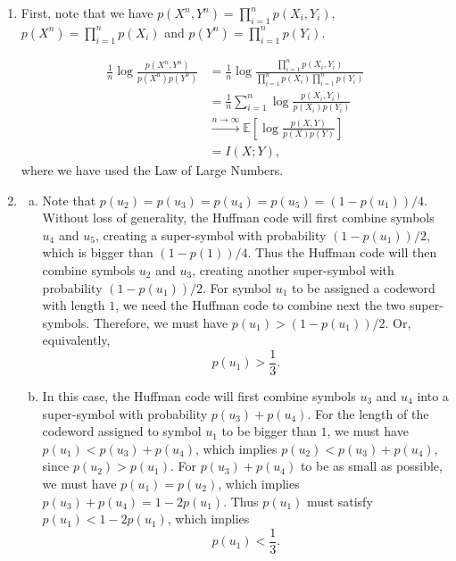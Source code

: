 \documentclass[12pt]{article}
\begin{document}
\begin{enumerate}
\begin{solution}
\begin{enumerate}[1)]
\item 


First, note that we have $p(X^n, Y^n) = \prod_{i=1}^np(X_i, Y_i)$, $p(X^n) = \prod_{i=1}^np(X_i)$ and $p(Y^n) = \prod_{i=1}^np(Y_i)$.

\begin{align*}
\frac{1}{n} \log \frac{p(X^n, Y^n)}{p(X^n)p(Y^n)} &= \frac{1}{n} \log \frac{\prod_{i=1}^np(X_i, Y_i)}{\prod_{i=1}^np(X_i)\prod_{i=1}^np(Y_i)} \\
&= \frac{1}{n} \sum_{i=1}^n \log \frac{p(X_i, Y_i)}{p(X_i)p(Y_i)} \\
& \xrightarrow{n \rightarrow \infty} \mathbb{E}[\log \frac{p(X, Y)}{p(X)p(Y)}]\\
&=I(X;Y),
\end{align*}
where we have used the Law of Large Numbers.



\item 

\begin{enumerate}[(a)]
\item Note that $p(u_2) = p(u_3) = p(u_4) = p(u_5) = (1 - p(u_1))/4$. Without loss of generality, the Huffman code will first combine symbols $u_4$ and $u_5$, creating a super-symbol with probability $(1 - p(u_1))/2$, which is bigger than $(1 - p(1))/4$. Thus the Huffman code will then combine symbols $u_2$ and $u_3$, creating another super-symbol with probability $(1- p(u_1))/2$. For symbol $u_1$ to be assigned a codeword with length $1$, we need the Huffman code to combine next the two super-symbols. Therefore, we must have $p(u_1) > (1 - p(u_1))/2$. Or, equivalently,
\begin{equation}
p(u_1) > \frac{1}{3}.
\end{equation}



\item In this case, the Huffman code will first combine symbols $u_3$ and $u_4$ into a super-symbol with probability $p(u_3) + p(u_4)$. For the length of the codeword assigned to symbol $u_1$ to be bigger than $1$, we must have $p(u_1) < p(u_3) + p(u_4)$, which implies $p(u_2) < p(u_3) + p(u_4)$, since $p(u_2) > p(u_1)$. For $p(u_3) + p(u_4)$ to be as small as possible, we must have $p(u_1) = p(u_2)$, which implies $p(u_3) + p(u_4) = 1 - 2p(u_1)$. Thus $p(u_1)$ must satisfy $p(u_1) < 1 - 2p(u_1)$, which implies
\begin{equation}
p(u_1) < \frac{1}{3}.
\end{equation}



\end{enumerate}
\end{enumerate}
\end{solution}
\end{enumerate}
\end{document}
